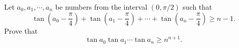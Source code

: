 Let $a_0,a_1,\cdots ,a_n$ be numbers from the interval $(0,\pi/2)$ such that \[ \tan (a_0-\frac{\pi}{4})+ \tan (a_1-\frac{\pi}{4})+\cdots +\tan (a_n-\frac{\pi}{4})\geq n-1.  \] Prove that \[ \tan a_0\tan a_1 \cdots \tan a_n\geq n^{n+1}.  \]